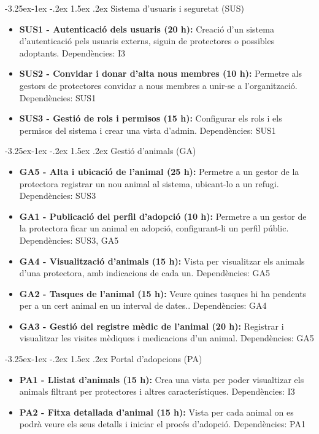 \documentclass[11pt,a4paper]{report}
\makeatletter
\renewcommand\paragraph{\@startsection{paragraph}{4}{\z@}%
    {-3.25ex\@plus -1ex \@minus -.2ex}%
    {1.5ex \@plus .2ex}
    {\normalfont\normalsize\bfseries}}
\makeatother
\begin{document}
\paragraph{Sistema d'usuaris i seguretat (SUS)}
\begin{itemize}
    \item \textbf{SUS1 - Autenticació dels usuaris (20 h):} Creació d'un sistema d'autenticació pels usuaris externs, siguin de protectores o possibles adoptants. Dependències: I3
    \item \textbf{SUS2 - Convidar i donar d'alta nous membres (10 h):} Permetre als gestors de protectores convidar a nous membres a unir-se a l'organització. Dependències: SUS1
    \item \textbf{SUS3 - Gestió de rols i permisos (15 h):} Configurar els rols i els permisos del sistema i crear una vista d'admin. Dependències: SUS1
\end{itemize}

\paragraph{Gestió d'animals (GA)}
\begin{itemize}
    \item \textbf{GA5 - Alta i ubicació de l'animal (25 h):} Permetre a un gestor de la protectora registrar un nou animal al sistema, ubicant-lo a un refugi. Dependències: SUS3
    \item \textbf{GA1 - Publicació del perfil d'adopció (10 h):} Permetre a un gestor de la protectora ficar un animal en adopció, configurant-li un perfil públic. Dependències: SUS3, GA5
    \item \textbf{GA4 - Visualització d'animals (15 h):} Vista per visualitzar els animals d'una protectora, amb indicacions de cada un. Dependències: GA5
    \item \textbf{GA2 - Tasques de l'animal (15 h):} Veure quines tasques hi ha pendents per a un cert animal en un interval de dates.. Dependències: GA4
    \item \textbf{GA3 - Gestió del registre mèdic de l'animal (20 h):} Registrar i visualitzar les visites mèdiques i medicacions d'un animal. Dependències: GA5
\end{itemize}

\paragraph{Portal d'adopcions (PA)}
\begin{itemize}
    \item \textbf{PA1 - Llistat d'animals (15 h):} Crea una vista per poder visualtizar els animals filtrant per protectores i altres característiques. Dependències: I3
    \item \textbf{PA2 - Fitxa detallada d'animal (15 h):} Vista per cada animal on es podrà veure els seus detalls i iniciar el procés d'adopció. Dependències: PA1
\end{itemize}
\end{document}
